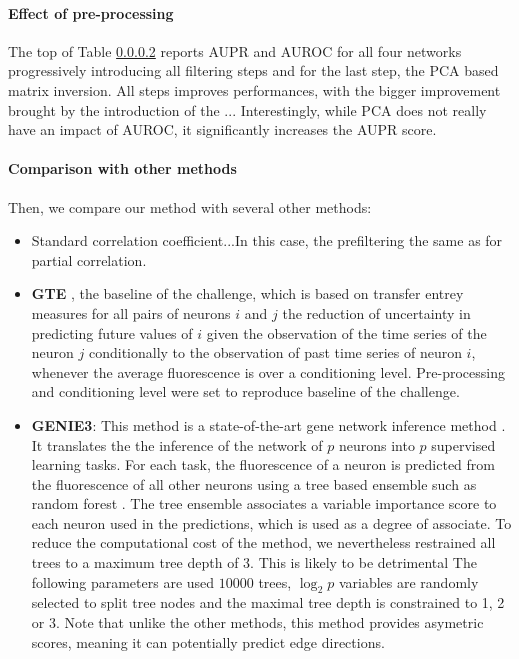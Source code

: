 \documentclass[wcp]{jmlr}
\begin{document}
\paragraph{Effect of pre-processing}

The top of Table \ref{} reports AUPR and AUROC for all four networks
progressively introducing all filtering steps and for the last step,
the PCA based matrix inversion. All steps improves performances, with
the bigger improvement brought by the introduction of the
... Interestingly, while PCA does not really have an impact of AUROC,
it significantly increases the AUPR score.

\paragraph{Comparison with other methods}

Then, we compare our method with several other methods:
\begin{itemize}
\item Standard correlation coefficient...In this case, the
  prefiltering the same as for partial correlation.
\item \textbf{GTE} \citep{stetter2012model}, the baseline of the
  challenge, which is based on transfer entrey measures for all pairs
  of neurons $i$ and $j$ the reduction of uncertainty in predicting
  future values of $i$ given the observation of the time series of the
  neuron $j$ conditionally to the observation of past time series of
  neuron $i$, whenever the average fluorescence is over a conditioning
  level. Pre-processing and conditioning level were set to reproduce
  baseline of the challenge.
\item \textbf{GENIE3}\citep{huynhthu2010inferring}: This method is a
  state-of-the-art gene network inference method \cite{dream5}. It
  translates the the inference of the network of $p$ neurons into $p$
  supervised learning tasks. For each task, the fluorescence of a
  neuron is predicted from the fluorescence of all other neurons using
  a tree based ensemble such as random forest
  \citep{breiman2001random}. The tree ensemble associates a variable
  importance score \citep{louppe2013understanding} to each neuron used
  in the predictions, which is used as a degree of associate. To reduce the computational cost of the method, we nevertheless restrained all trees to a maximum tree depth of 3.  This is likely to be detrimental The
  following parameters are used $10000$ trees, $\log_2{p}$ variables
  are randomly selected to split tree nodes and the maximal tree depth
  is constrained to 1, 2 or 3. Note that unlike the other methods, this method provides asymetric scores, meaning it can potentially predict edge directions.
\end{itemize}
\end{document}
